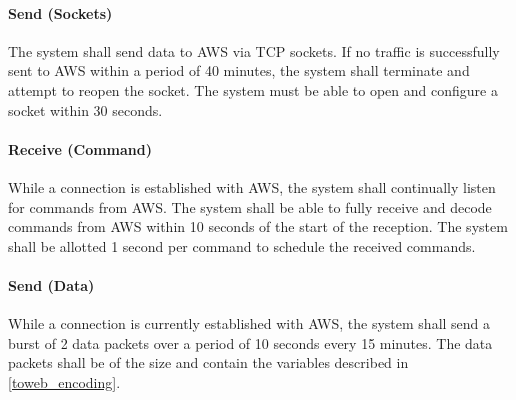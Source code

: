 \paragraph{Send (Sockets)} The system shall send data to AWS via TCP sockets. If no traffic is successfully sent to AWS within a period of 40 minutes, the system shall terminate and attempt to reopen the socket. The system must be able to open and configure a socket within 30 seconds.

\paragraph{Receive (Command)} While a connection is established with AWS, the system shall continually listen for commands from AWS. The system shall be able to fully receive and decode commands from AWS within 10 seconds of the start of the reception. The system shall be allotted 1 second per command to schedule the received commands.

\paragraph{Send (Data)} While a connection is currently established with AWS, the system shall send a burst of 2 data packets over a period of 10 seconds every 15 minutes. The data packets shall be of the size and contain the variables described in \autoref{toweb_encoding}.

